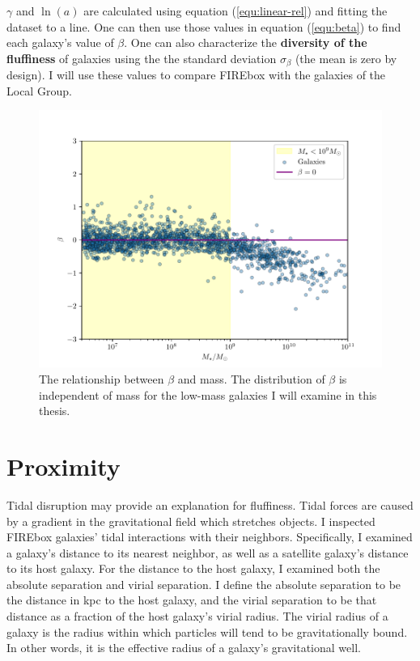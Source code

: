 $\gamma$ and $\ln(a)$ are calculated using equation (\ref{equ:linear-rel}) and fitting the dataset to a line. One can then use those values in equation (\ref{equ:beta}) to find each galaxy's value of $\beta$. One can also characterize the \textbf{diversity of the fluffiness} of galaxies using the the standard deviation $\sigma_\beta$ (the mean is zero by design). I will use these values to compare FIREbox with the galaxies of the Local Group.

\begin{figure}
    \centering
    \includegraphics[width=\textwidth*2/3]{figs/me/beta-mass.pdf}
    \caption{The relationship between $\beta$ and mass. The distribution of $\beta$ is independent of mass for the low-mass galaxies I will examine in this thesis.}
    \label{fig:beta-mass}
\end{figure}

\section{Proximity}


 Tidal disruption may provide an explanation for fluffiness. Tidal forces are caused by a gradient in the gravitational field which stretches objects. I inspected FIREbox galaxies' tidal interactions with their neighbors. Specifically, I examined a galaxy's distance to its nearest neighbor, as well as a satellite galaxy's distance to its host galaxy. For the distance to the host galaxy, I examined both the absolute separation and virial separation. I define the absolute separation to be the distance in kpc to the host galaxy, and the virial separation to be that distance as a fraction of the host galaxy's virial radius. The virial radius of a galaxy is the radius within which particles will tend to be gravitationally bound. In other words, it is the effective radius of a galaxy's gravitational well.

